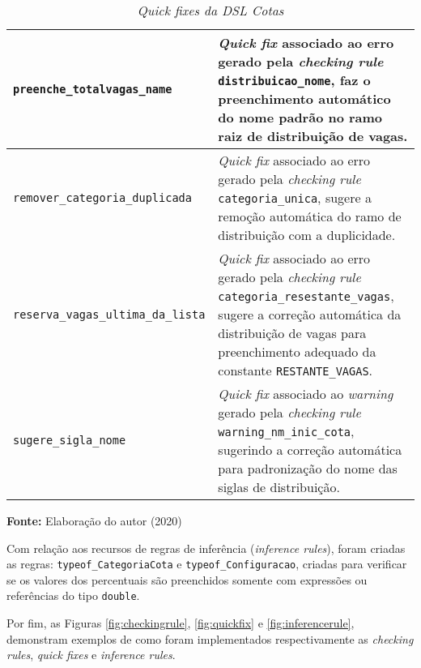 \begin{table}[ht]
\caption{\textit{Quick fixes da DSL Cotas}}
\label{tblquickfixes}
\centering

\begin{tabular}{|p{6cm}|p{9cm}|}
\hline
\texttt{preenche\_totalvagas\_name} & \textit{Quick fix} associado ao erro gerado pela \textit{checking rule} \texttt{distribuicao\_nome}, faz o preenchimento automático do nome padrão no ramo raiz de distribuição de vagas.                                                                                      \\ \hline
\texttt{remover\_categoria\_duplicada} & \textit{Quick fix} associado ao erro gerado pela \textit{checking rule} \texttt{categoria\_unica}, sugere a remoção automática do ramo de distribuição com a duplicidade.

\\ \hline
\texttt{reserva\_vagas\_ultima\_da\_lista} & \textit{Quick fix} associado ao erro gerado pela \textit{checking rule} \texttt{categoria\_resestante\_vagas}, sugere a correção automática da distribuição de vagas para preenchimento adequado da constante \texttt{RESTANTE\_VAGAS}.

\\ \hline
\texttt{sugere\_sigla\_nome} & \textit{Quick fix} associado ao \textit{warning} gerado pela \textit{checking rule} \texttt{warning\_nm\_inic\_cota}, sugerindo a correção automática para padronização do nome das siglas de distribuição.
                  \\ \hline      

\end{tabular}

  \par\medskip\textbf{Fonte:} Elaboração do autor (2020) \par\medskip
\end{table}

Com relação aos recursos de regras de inferência (\textit{inference rules}), foram criadas as regras: \texttt{typeof\_CategoriaCota} e \texttt{typeof\_Configuracao}, criadas para verificar se os valores dos percentuais são preenchidos somente com expressões ou referências do tipo \texttt{double}.

Por fim, as Figuras \ref{fig:checkingrule}, \ref{fig:quickfix} e \ref{fig:inferencerule}, demonstram exemplos de como foram implementados respectivamente as \textit{checking rules}, \textit{quick fixes} e \textit{inference rules}. 
